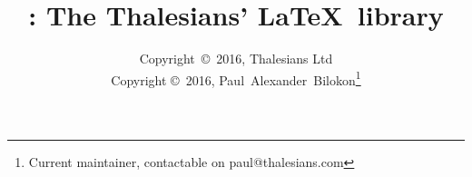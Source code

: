 

\documentclass[10pt]{article}

\usepackage{multind}

\usepackage[usecolour=true]{lathalesians-commons}
\usepackage[usegeometry=true]{lathalesians-formatting}
\usepackage{lathalesians-font}
\usepackage{lathalesians-code}
\usepackage{lathalesians-analysis}
\usepackage{lathalesians-linear}
\usepackage{lathalesians-probability}
\usepackage{lathalesians-categories}
\usepackage{lathalesians-theorems}
\usepackage{lathalesians-domains}
\usepackage{lathalesians-computability}

\usepackage{longtable}
\usepackage{nomencl}
\usepackage{url}

\title{\LaThalesians: The Thalesians' \LaTeX~library}
\author{Copyright~\copyright~2016, Thalesians Ltd \\
Copyright \copyright~2016, Paul~Alexander~Bilokon\footnote{Current maintainer, contactable on \textsf{paul@thalesians.com}}}


\makenomenclature



\maketitle

\tableofcontents

\section{Overview}

The \LaThalesians library comprises a heterogeneous collection of \LaTeX~packages, which facilitate the typesetting of the Thalesians' work in mathematics, computer science, and finance. It was originally developed by Paul~Bilokon to support his academic and professional work and the library's scope still reflects some of his personal biases, \viz:
\begin{itemize}
\item mathematical finance,
\item econometrics,
\item programming,
\item scientific computing,
\item algorithms,
\item statistics,
\item stochastic analysis,
\item probability theory,
\item domain theory,
\item computability theory.
\end{itemize}

